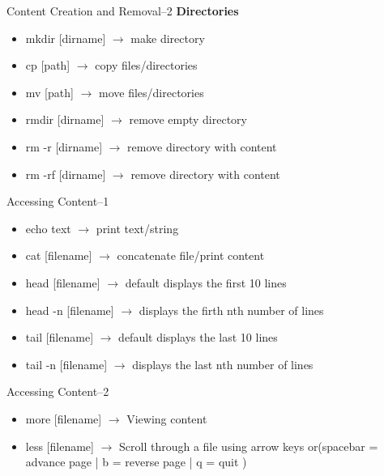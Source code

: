 \begin{frame}[t]{Content Creation and Removal--2}
	\textbf{Directories}
	\begin{itemize}
		\item mkdir [dirname] $\rightarrow$ make directory	
		\item cp [path] $\rightarrow$ copy files/directories	
		\item mv [path] $\rightarrow$ move files/directories	
		\item rmdir [dirname] $\rightarrow$ remove empty directory
		\item rm -r [dirname] $\rightarrow$ remove directory with content
		\item rm -rf [dirname] $\rightarrow$ remove directory with content
	\end{itemize}
\end{frame}




\begin{frame}[t]{Accessing Content--1}
	\begin{itemize}
		\item echo text $\rightarrow$ print text/string
		\item cat [filename]  $\rightarrow$ concatenate file/print content
		\item head [filename] $\rightarrow$ default displays the first 10 lines
		\item head -n [filename] $\rightarrow$ displays the firth nth number of 
		lines
		\item tail [filename] $\rightarrow$ default displays the last 10 
		lines	
		\item tail -n [filename] $\rightarrow$ displays the last nth number of  
		lines	
	\end{itemize}
\end{frame}

\begin{frame}[t]{Accessing Content--2}
	\begin{itemize}		
		\item more [filename] $\rightarrow$ Viewing content
		\item less [filename] $\rightarrow$ Scroll through a file using arrow 
		keys or(spacebar = advance page | b = reverse page | q = quit
		)
	\end{itemize}
\end{frame}

